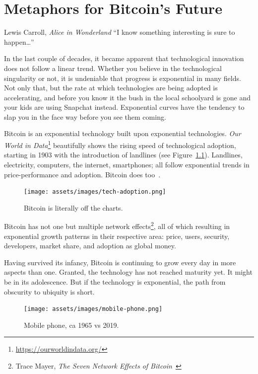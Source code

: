 \chapter{Metaphors for Bitcoin's Future}
\label{les:21}

\begin{chapquote}{Lewis Carroll, \textit{Alice in Wonderland}}
\enquote{I know something interesting is sure to happen\ldots}
\end{chapquote}

In the last couple of decades, it became apparent that technological
innovation does not follow a linear trend. Whether you believe in the
technological singularity or not, it is undeniable that progress is
exponential in many fields. Not only that, but the rate at which
technologies are being adopted is accelerating, and before you know it
the bush in the local schoolyard is gone and your kids are using
Snapchat instead. Exponential curves have the tendency to slap you in
the face way before you see them coming.

Bitcoin is an exponential technology built upon exponential technologies.
\textit{Our World in Data}\footnote{\url{https://ourworldindata.org/}}
beautifully shows the rising speed of technological adoption, starting in 1903
with the introduction of landlines (see Figure~\ref{fig:tech-adoption}).
Landlines, electricity, computers, the internet, smartphones; all follow
exponential trends in price-performance and adoption. Bitcoin does
too~\cite{tech-adoption}.

\begin{figure}
  \texttt{[image: assets/images/tech-adoption.png]}
  \caption{Bitcoin is literally off the charts.}
  \label{fig:tech-adoption}
\end{figure}

Bitcoin has not one but multiple network effects\footnote{Trace Mayer,
\textit{The Seven Network Effects of Bitcoin}~\cite{7-network-effects}}, all of
which resulting in exponential growth patterns in their respective area: price,
users, security, developers, market share, and adoption as global money.

Having survived its infancy, Bitcoin is continuing to grow every day in
more aspects than one. Granted, the technology has not reached maturity
yet. It might be in its adolescence. But if the technology is
exponential, the path from obscurity to ubiquity is short.

\begin{figure}
  \texttt{[image: assets/images/mobile-phone.png]}
  \caption{Mobile phone, ca 1965 vs 2019.}
  \label{fig:mobile-phone}
\end{figure}

